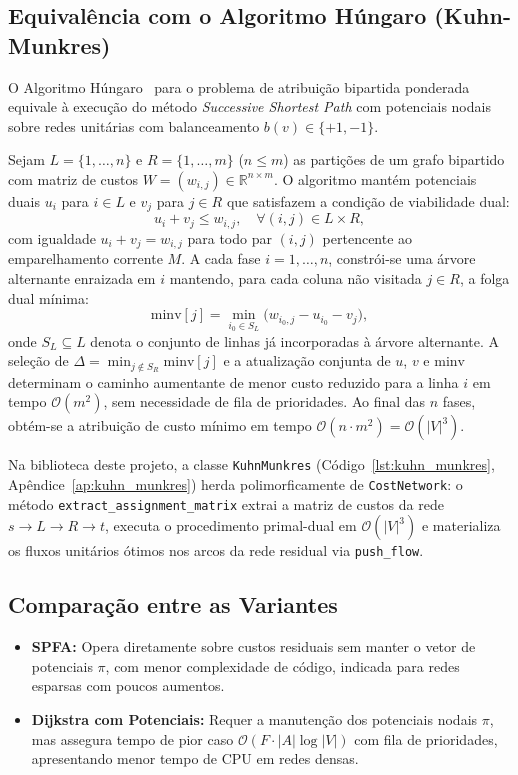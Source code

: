 \subsection{Equivalência com o Algoritmo Húngaro (Kuhn-Munkres)}

O Algoritmo Húngaro~\cite{kuhn1955hungarian, munkres1957algorithms} para o problema de atribuição bipartida ponderada equivale à execução do método \textit{Successive Shortest Path} com potenciais nodais sobre redes unitárias com balanceamento $b(v) \in \{+1, -1\}$.

Sejam $L = \{1, \dots, n\}$ e $R = \{1, \dots, m\}$ ($n \le m$) as partições de um grafo bipartido com matriz de custos $W = (w_{i,j}) \in \mathbb{R}^{n \times m}$. O algoritmo mantém potenciais duais $u_i$ para $i \in L$ e $v_j$ para $j \in R$ que satisfazem a condição de viabilidade dual:
\begin{equation}
    u_i + v_j \le w_{i,j}, \quad \forall (i, j) \in L \times R,
\end{equation}
com igualdade $u_i + v_j = w_{i,j}$ para todo par $(i, j)$ pertencente ao emparelhamento corrente $M$. A cada fase $i = 1, \dots, n$, constrói-se uma árvore alternante enraizada em $i$ mantendo, para cada coluna não visitada $j \in R$, a folga dual mínima:
\begin{equation}
    \text{minv}[j] = \min_{i_0 \in S_L} \bigl(w_{i_0, j} - u_{i_0} - v_j\bigr),
\end{equation}
onde $S_L \subseteq L$ denota o conjunto de linhas já incorporadas à árvore alternante. A seleção de $\Delta = \min_{j \notin S_R} \text{minv}[j]$ e a atualização conjunta de $u$, $v$ e $\text{minv}$ determinam o caminho aumentante de menor custo reduzido para a linha $i$ em tempo $\mathcal{O}(m^2)$, sem necessidade de fila de prioridades. Ao final das $n$ fases, obtém-se a atribuição de custo mínimo em tempo $\mathcal{O}(n \cdot m^2) = \mathcal{O}(|V|^3)$.

Na biblioteca deste projeto, a classe \lstinline{KuhnMunkres} (Código~\ref{lst:kuhn_munkres}, Apêndice~\ref{ap:kuhn_munkres}) herda polimorficamente de \lstinline{CostNetwork}: o método \lstinline{extract_assignment_matrix} extrai a matriz de custos da rede $s \to L \to R \to t$, executa o procedimento primal-dual em $\mathcal{O}(|V|^3)$ e materializa os fluxos unitários ótimos nos arcos da rede residual via \lstinline{push_flow}.


\subsection{Comparação entre as Variantes}

\begin{itemize}
    \item \textbf{SPFA:} Opera diretamente sobre custos residuais sem manter o vetor de potenciais $\pi$, com menor complexidade de código, indicada para redes esparsas com poucos aumentos.
    \item \textbf{Dijkstra com Potenciais:} Requer a manutenção dos potenciais nodais $\pi$, mas assegura tempo de pior caso $\mathcal{O}(F \cdot |A| \log |V|)$ com fila de prioridades, apresentando menor tempo de CPU em redes densas.
\end{itemize}

